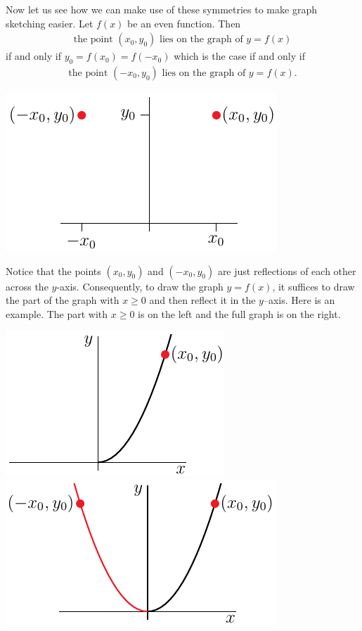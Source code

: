 Now let us see how we can make use of these symmetries to make graph sketching easier. Let
$f(x)$ be an even function. Then
\begin{align*}
\text{the point } (x_0,y_0)\text{ lies on the graph of }y=f(x)
\end{align*}
if and only if $y_0= f(x_0) = f(-x_0)$ which is the case if and only if
\begin{align*}
\text{the point }(-x_0,y_0)\text{ lies on the graph of }y=f(x).
\end{align*}
\begin{efig}
\begin{center}
   \includegraphics{evenPt}
\end{center}
\end{efig}
Notice that the points $(x_0,y_0)$ and $(-x_0,y_0)$ are just reflections of
each other across the $y$-axis. Consequently, to draw the graph $y=f(x)$, it suffices to
draw the part of the graph with $x\ge 0$ and then reflect it in the $y$--axis.
Here is an example. The part with $x\ge 0$ is on the left and the full graph is on the
right.
\begin{efig}
\begin{center}
   \includegraphics{evenRt}\qquad\includegraphics{evenFull}
\end{center}
\end{efig}


